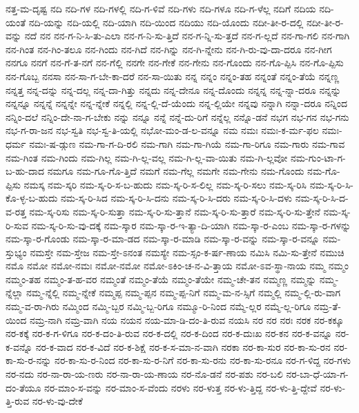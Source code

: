 {ನತ್ತ-ಮ-ದೃಷ್ಟ
ನದಿ
ನದಿ-ಗಳ
ನದಿ-ಗಳಲ್ಲಿ
ನದಿ-ಗ-ಳಿವೆ
ನದಿ-ಗಳು
ನದಿ-ಗಳೂ
ನದಿ-ಗ-ಳೆಲ್ಲ
ನದಿಗೆ
ನದಿಯ
ನದಿ-ಯಂತೆ
ನದಿ-ಯನ್ನು
ನದಿ-ಯಲ್ಲಿ
ನದಿ-ಯಾಗಿ
ನದಿ-ಯಿಂದ
ನದಿಯು
ನದಿ-ಯೊಂದು
ನದೀ-ತೀ-ರ-ದಲ್ಲಿ
ನದೀ-ತೀ-ರ-ವನ್ನು
ನದೆ
ನನ
ನನ-ಗ-ನಿ-ಸಿ-ತು-ಎಲಾ
ನನ-ಗ-ನಿ-ಸು-ತ್ತಿದೆ
ನನ-ಗ-ನ್ನಿ-ಸು-ತ್ತದೆ
ನನ-ಗ-ಲ್ಲದೆ
ನನ-ಗಾ-ಗಲಿ
ನನ-ಗಾಗಿ
ನನ-ಗಿಂತ
ನನ-ಗಿಂ-ತಲೂ
ನನ-ಗಿಂದು
ನನ-ಗಿದೆ
ನನ-ಗಿನ್ನು
ನನ-ಗಿ-ನ್ನೇನು
ನನ-ಗಿ-ರು-ವು-ದಾ-ದರೂ
ನನ-ಗೀಗ
ನನಗೂ
ನನಗೆ
ನನ-ಗೆ-ತ-ನಗೆ
ನನ-ಗೆಲ್ಲಿ
ನನಗೇ
ನನ-ಗೇಕೆ
ನನ-ಗೇನು
ನನ-ಗೊಂದು
ನನ-ಗೊ-ಪ್ಪಿಸಿ
ನನ-ಗೊ-ಪ್ಪಿಸು
ನನ-ಗೊಬ್ಬ
ನನಸಾ
ನನ-ಸಾ-ಗ-ಬೇ-ಕಾ-ದರೆ
ನನ-ಸಾ-ಯಿತು
ನನ್ನ
ನನ್ನಂ
ನನ್ನಂ-ತಹ
ನನ್ನಂತೆ
ನನ್ನಂ-ತೆಯೆ
ನನ್ನಣ್ಣ
ನನ್ನತ್ತ
ನನ್ನ-ದನ್ನು
ನನ್ನ-ದಲ್ಲ
ನನ್ನ-ದಾ-ಗಿತ್ತು
ನನ್ನದು
ನನ್ನ-ದೇನೂ
ನನ್ನ-ದೊಂದು
ನನ್ನನ್ನ
ನನ್ನ-ನ್ನಾ-ದರೂ
ನನ್ನನ್ನು
ನನ್ನನ್ನೂ
ನನ್ನನ್ನೆ
ನನ್ನನ್ನೇ
ನನ್ನ-ನ್ನೇಕೆ
ನನ್ನಲ್ಲಿ
ನನ್ನ-ಲ್ಲಿ-ದೆ-ಯೆಂದು
ನನ್ನ-ಲ್ಲಿಯೇ
ನನ್ನವು
ನನ್ನಾಗಿ
ನನ್ನಾ-ದರೂ
ನನ್ನಿಂದ
ನನ್ನಿಂ-ದಲೆ
ನನ್ನಿಂ-ದೇ-ನಾ-ಗ-ಬೇಕು
ನನ್ನು
ನನ್ನೂ
ನನ್ನೆ
ನನ್ನೆ-ದು-ರಿಗೆ
ನನ್ನೆಲ್ಲ
ನನ್ನೊ-ಡನೆ
ನಭಗ
ನಭ-ಗನ
ನಭ-ಗನು
ನಭ-ಗ-ರಾ-ಜನ
ನಭ-ಸ್ವತಿ
ನಭ-ಸ್ವ-ತಿ-ಯಲ್ಲಿ
ನಭೋ-ಮಂ-ಡ-ಲ-ವನ್ನೂ
ನಮ
ನಮಃ
ನಮಃ-ಕ-ರ್ಮ-ಫಲ
ನಮಃ-ಧರ್ಮ
ನಮಃ-ಷ-ಡ್ಗುಣ
ನಮ-ಗಾ-ಗ-ದಿ-ರಲಿ
ನಮ-ಗಾಗಿ
ನಮ-ಗಾ-ಗಿಯೆ
ನಮ-ಗಾ-ರಿಗೂ
ನಮ-ಗಾರು
ನಮ-ಗಾವ
ನಮ-ಗಿಂತ
ನಮ-ಗಿಂದು
ನಮ-ಗಿಲ್ಲ
ನಮ-ಗಿ-ಲ್ಲ-ವಲ್ಲ
ನಮ-ಗಿ-ಲ್ಲ-ವಾ-ಯಿತು
ನಮ-ಗಿ-ಲ್ಲವೋ
ನಮ-ಗುಂ-ಟಾ-ಗ-ಬ-ಹು-ದಾದ
ನಮಗೂ
ನಮ-ಗೂ-ಗೊ-ತ್ತಿದೆ
ನಮಗೆ
ನಮ-ಗೆಲ್ಲ
ನಮಗೇ
ನಮ-ಗೇನು
ನಮ-ಗೊಂದು
ನಮ-ಗೊ-ಪ್ಪಿಸು
ನಮಸ್ಕ
ನಮ-ಸ್ಕರಿ
ನಮ-ಸ್ಕ-ರಿ-ಸ-ಬ-ಹುದು
ನಮ-ಸ್ಕ-ರಿ-ಸ-ಲಿಲ್ಲ
ನಮ-ಸ್ಕ-ರಿ-ಸಲು
ನಮ-ಸ್ಕ-ರಿಸಿ
ನಮ-ಸ್ಕ-ರಿ-ಸಿ-ಕೊ-ಳ್ಳ-ಬ-ಹುದು
ನಮ-ಸ್ಕ-ರಿ-ಸಿದ
ನಮ-ಸ್ಕ-ರಿ-ಸಿ-ದನು
ನಮ-ಸ್ಕ-ರಿ-ಸಿ-ದರು
ನಮ-ಸ್ಕ-ರಿ-ಸಿ-ದಳು
ನಮ-ಸ್ಕ-ರಿ-ಸಿ-ದ-ವ-ರತ್ತ
ನಮ-ಸ್ಕ-ರಿಸು
ನಮ-ಸ್ಕ-ರಿ-ಸುತ್ತಾ
ನಮ-ಸ್ಕ-ರಿ-ಸು-ತ್ತಾನೆ
ನಮ-ಸ್ಕ-ರಿ-ಸು-ತ್ತಾರೆ
ನಮ-ಸ್ಕ-ರಿ-ಸು-ತ್ತೇನೆ
ನಮ-ಸ್ಕ-ರಿ-ಸುವ
ನಮ-ಸ್ಕ-ರಿ-ಸು-ವು-ದಕ್ಕೆ
ನಮ-ಸ್ಕಾರ
ನಮ-ಸ್ಕಾ-ರ-ಇ-ತ್ಯಾ-ದಿ-ಯಾಗಿ
ನಮ-ಸ್ಕಾ-ರ-ಎಂಬ
ನಮ-ಸ್ಕಾ-ರ-ಗಳನ್ನು
ನಮ-ಸ್ಕಾ-ರ-ಗೊಂಡು
ನಮ-ಸ್ಕಾ-ರ-ಮಾ-ಡದ
ನಮ-ಸ್ಕಾ-ರ-ಮಾಡಿ
ನಮ-ಸ್ಕಾ-ರ-ವನ್ನು
ನಮ-ಸ್ಕಾ-ರ-ವನ್ನೂ
ನಮ-ಸ್ತುಭ್ಯಂ
ನಮಸ್ತೇ
ನಮ-ಸ್ತೇಜ
ನಮ-ಸ್ತೇ-ಽನಂತ
ನಮಸ್ಯೇ
ನಮ-ಸ್ಸಂ-ಕ-ರ್ಷ-ಣಾಯ
ನಮಿಸಿ
ನಮಿ-ಸು-ತ್ತೇನೆ
ನಮುಚಿ
ನಮೊ
ನಮೋ
ನಮೋ-ನಮಃ
ನಮೋ-ನಮೋ
ನಮೋ-ಽಕಿಂ-ಚ-ನ-ವಿ-ತ್ತಾಯ
ನಮೋ-ಽವ-ಸ್ಥಾ-ನಾಯ
ನಮ್ಮ
ನಮ್ಮಂ
ನಮ್ಮಂ-ತಹ
ನಮ್ಮಂ-ತ-ಹ-ವರ
ನಮ್ಮಂತೆ
ನಮ್ಮಂ-ತೆಯೆ
ನಮ್ಮಂ-ತೆಯೇ
ನಮ್ಮ-ಚೇ-ತನ
ನಮ್ಮಣ್ಣ
ನಮ್ಮನ್ನು
ನಮ್ಮ-ನ್ನೆಲ್ಲಾ
ನಮ್ಮ-ನ್ನೆಲ್ಲಿ
ನಮ್ಮ-ನ್ನೇಕೆ
ನಮ್ಮಪ್ಪ
ನಮ್ಮ-ಪ್ಪನ
ನಮ್ಮ-ಪ್ಪ-ನಿಗೆ
ನಮ್ಮ-ಮ-ನ-ಸ್ಸಿಗೆ
ನಮ್ಮಲ್ಲಿ
ನಮ್ಮ-ಲ್ಲಿ-ರು-ವಾಗ
ನಮ್ಮ-ವ-ರಾ-ಗಿರು
ನಮ್ಮಿಂದ
ನಮ್ಮಿ-ಬ್ಬರ
ನಮ್ಮಿ-ಬ್ಬ-ರಿಗೂ
ನಮ್ಮೂ-ರಿ-ನಿಂದ
ನಮ್ಮೆ-ಲ್ಲರ
ನಮ್ಮೆ-ಲ್ಲ-ರಿಗೂ
ನಮ್ರ-ತೆ-ಯಿಂದ
ನಮ್ರ-ನಾಗಿ
ನಮ್ರ-ವಾಗಿ
ನಯ
ನಯನ
ನಯ-ಮಾ-ಡಿ-ದಂ-ತಿ-ರುವ
ನಯಸಿ
ನರ
ನರ
ನರಃ
ನರಕ
ನರ-ಕಕ್ಕೂ
ನರ-ಕಕ್ಕೆ
ನರ-ಕ-ಗ-ಳಿಗೂ
ನರ-ಕ-ದಂ-ತಿ-ರುವ
ನರ-ಕ-ದಲ್ಲಿ
ನರ-ಕ-ದಿಂದ
ನರ-ಕ-ದುಃಖ
ನರ-ಕನ
ನರ-ಕ-ವನ್ನೂ
ನರ-ಕ-ವನ್ನೊ
ನರ-ಕ-ವಾದ
ನರ-ಕ-ವಿದೆ
ನರ-ಕ-ಶಿಕ್ಷೆ
ನರ-ಕ-ಸ-ಮಾ-ನ-ವಾಗಿ
ನರಕಾ
ನರ-ಕಾ-ಸುರ
ನರ-ಕಾ-ಸು-ರನ
ನರ-ಕಾ-ಸು-ರ-ನನ್ನು
ನರ-ಕಾ-ಸು-ರ-ನಿಂದ
ನರ-ಕಾ-ಸು-ರ-ನಿಗೆ
ನರ-ಕಾ-ಸು-ರನು
ನರ-ಕಾ-ಸು-ರನೂ
ನರ-ಗ-ಳಿದ್ದ
ನರ-ಗಳು
ನರ-ನದು
ನರ-ನಾ-ರಾ-ಯ-ಣರು
ನರ-ನಾ-ರಾ-ಯ-ಣಾಯ
ನರ-ನೊ-ಡನೆ
ನರ-ಪಶು
ನರ-ಬಲಿ
ನರ-ಬಾ-ಧೆ-ಯಾ-ಗ-ದಂ-ತೆಯೂ
ನರ-ಮಾಂ-ಸ-ವನ್ನು
ನರ-ಮಾಂ-ಸ-ವೆಂದು
ನರಳು
ನರ-ಳುತ್ತ
ನರ-ಳು-ತ್ತಿದ್ದ
ನರ-ಳು-ತ್ತಿ-ದ್ದೇವೆ
ನರ-ಳು-ತ್ತಿ-ರುವ
ನರ-ಳು-ವು-ದೇಕೆ
}
